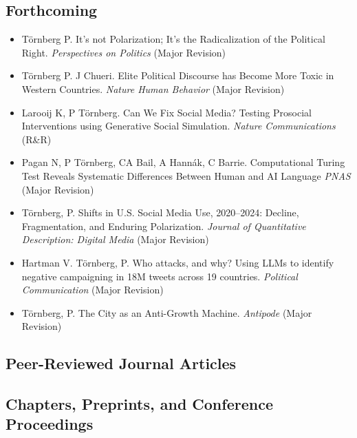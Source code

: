 \documentclass[11pt,a4paper]{moderncv}
\begin{document}
\subsection*{Forthcoming}
\begin{itemize}
    \item Törnberg P. It's not Polarization; It's the Radicalization of the Political Right. \textit{Perspectives on Politics} (Major Revision)
    \item Törnberg P. J Chueri. Elite Political Discourse has Become More Toxic in Western Countries. \textit{Nature Human Behavior} (Major Revision)
    \item Larooij K, P Törnberg. Can We Fix Social Media? Testing Prosocial Interventions using Generative Social Simulation. \textit{Nature Communications} (R\&R)
    \item Pagan N, P Törnberg, CA Bail, A Hannák, C Barrie. Computational Turing Test Reveals Systematic Differences Between Human and AI Language \textit{PNAS}  (Major Revision)
    \item Törnberg, P. Shifts in U.S. Social Media Use, 2020–2024: Decline, Fragmentation, and Enduring Polarization. \textit{Journal of Quantitative Description: Digital Media} (Major Revision)
    \item Hartman V. Törnberg, P. Who attacks, and why? Using LLMs to identify negative campaigning in 18M tweets across 19 countries. \textit{Political Communication} (Major Revision)
    \item Törnberg, P. The City as an Anti-Growth Machine. \textit{Antipode} (Major Revision)
    
\end{itemize}


\subsection*{Peer-Reviewed Journal Articles}
\printbibliography[type=article,heading=none,resetnumbers=true]

\subsection*{Chapters, Preprints, and Conference Proceedings}
\printbibliography[nottype=article,nottype=book,heading=none,resetnumbers=false]
\end{document}

